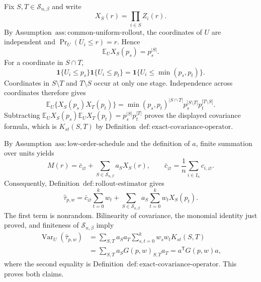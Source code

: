 Fix \(S,T\in\mathcal S_{n,\beta}\) and write
\[
X_S(r)=\prod_{i\in S}Z_i(r).
\]
By Assumption~\(\mathrm{ass{:}common\text{-}uniform\text{-}rollout}\), the coordinates of \(U\) are independent and \(\Pr_U(U_i\le r)=r\).  Hence
\[
\mathbb E_U X_S(p_s)=p_s^{|S|}.
\]
For a coordinate in \(S\cap T\),
\[
\mathbf 1\{U_i\le p_s\}\mathbf 1\{U_i\le p_t\}
=\mathbf 1\{U_i\le\min(p_s,p_t)\}.
\]
Coordinates in \(S\setminus T\) and \(T\setminus S\) occur at only one stage.  Independence across coordinates therefore gives
\[
\mathbb E_U\{X_S(p_s)X_T(p_t)\}
=\min(p_s,p_t)^{|S\cap T|}p_s^{|S\setminus T|}p_t^{|T\setminus S|}.
\]
Subtracting \(\mathbb E_U X_S(p_s)\mathbb E_U X_T(p_t)=p_s^{|S|}p_t^{|T|}\) proves the displayed covariance formula, which is \(K_{st}(S,T)\) by Definition~\(\mathrm{def{:}exact\text{-}covariance\text{-}operator}\).

By Assumption~\(\mathrm{ass{:}low\text{-}order\text{-}schedule}\) and the definition of \(a\), finite summation over units yields
\[
M(r)=\bar c_{\varnothing}+\sum_{S\in\mathcal S_{n,\beta}}a_SX_S(r),
\qquad
\bar c_{\varnothing}=\frac1n\sum_{i\in I_n}c_{i,\varnothing}.
\]
Consequently, Definition~\(\mathrm{def{:}rollout\text{-}estimator}\) gives
\[
\widehat\tau_{p,w}
=\bar c_{\varnothing}\sum_{t=0}^kw_t
+\sum_{S\in\mathcal S_{n,\beta}}a_S\sum_{t=0}^kw_tX_S(p_t).
\]
The first term is nonrandom.  Bilinearity of covariance, the monomial identity just proved, and finiteness of \(\mathcal S_{n,\beta}\) imply
\[
\begin{aligned}
\operatorname{Var}_U(\widehat\tau_{p,w})
&=\sum_{S,T}a_Sa_T\sum_{s,t=0}^kw_sw_tK_{st}(S,T)\\
&=\sum_{S,T}a_SG(p,w)_{S,T}a_T
=a^{\mathsf T}G(p,w)a,
\end{aligned}
\]
where the second equality is Definition~\(\mathrm{def{:}exact\text{-}covariance\text{-}operator}\).  This proves both claims.